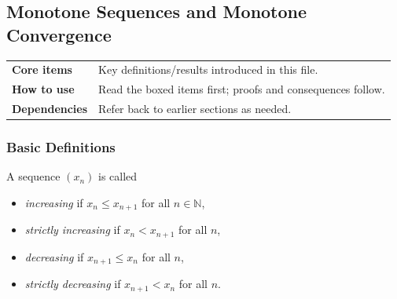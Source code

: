 
\subsection{Monotone Sequences and Monotone Convergence}

\begin{tcolorbox}[colback=gray!6, colframe=gray!40, arc=2pt,
  left=6pt, right=6pt, top=4pt, bottom=4pt,
  title={\small\textbf{Monotone Sequences — Quick Reference}},
  fonttitle=\small\bfseries]
\begin{tabular}{@{}p{}p{}@{}}
\textbf{Core items} & Key definitions/results introduced in this file.\\
\textbf{How to use} & Read the boxed items first; proofs and consequences follow.\\
\textbf{Dependencies} & Refer back to earlier sections as needed.\\
\end{tabular}
\end{tcolorbox}


\subsubsection{Basic Definitions}

\begin{tcolorbox}[colback=propbox, colframe=propborder, arc=2pt,
  left=6pt, right=6pt, top=4pt, bottom=4pt,
  title={\small\textbf{Definition (Increasing and decreasing sequences)}},
  fonttitle=\small\bfseries]
A sequence $(x_n)$ is called

\begin{itemize}
\item \emph{increasing} if $x_n \le x_{n+1}$ for all $n \in \mathbb{N}$,
\item \emph{strictly increasing} if $x_n < x_{n+1}$ for all $n$,
\item \emph{decreasing} if $x_{n+1} \le x_n$ for all $n$,
\item \emph{strictly decreasing} if $x_{n+1} < x_n$ for all $n$.
\end{itemize}
\end{tcolorbox}

